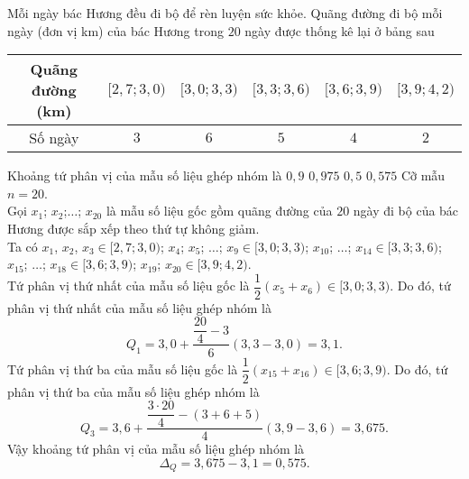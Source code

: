 \begin{ex}%
	Mỗi ngày bác Hương đều đi bộ để rèn luyện sức khỏe. Quãng đường đi bộ mỗi ngày (đơn vị km) của bác Hương trong $20$ ngày được thống kê lại ở bảng sau
	\begin{center}
		\begin{tabular}{|c|c|c|c|c|c|}
			\hline
			Quãng đường (km) & $[2{,}7;3{,}0)$ & $[3{,}0;3{,}3)$ & $[3{,}3;3{,}6)$ & $[3{,}6;3{,}9)$ & $[3{,}9;4{,}2)$ \\
			\hline
			Số ngày          & $3$             & $6$             & $5$             & $4$             & $2$             \\
			\hline
		\end{tabular}
	\end{center}
	Khoảng tứ phân vị của mẫu số liệu ghép nhóm là
	\choice
	{$0{,}9$}
	{$0{,}975$}
	{$0{,}5$}
	{\True $0{,}575$}
	\loigiai
	{
	Cỡ mẫu $n=20$.\\
	Gọi $x_1$; $x_2$;$\ldots$; $x_{20}$ là mẫu số liệu gốc gồm quãng đường của $20$ ngày đi bộ của bác Hương được sắp xếp theo thứ tự không giảm.\\
	Ta có $x_1$, $x_2$, $x_3\in [2{,}7;3{,}0)$; $x_4$; $x_5$; $\ldots$; $x_9\in [3{,}0;3{,}3)$; $x_{10}$; $\ldots$; $x_{14}\in [3{,}3;3{,}6)$; \break$x_{15}$; $\ldots$; $x_{18}\in [3{,}6;3{,}9)$; $x_{19}$; $x_{20}\in [3{,}9;4{,}2)$.\\
	Tứ phân vị thứ nhất của mẫu số liệu gốc là $\dfrac{1}{2}(x_5+x_6)\in [3{,}0;3{,}3)$. Do đó, tứ phân vị thứ nhất của mẫu số liệu ghép nhóm là
	\[Q_1=3{,}0+\dfrac{\dfrac{20}{4}-3}{6}(3{,}3-3{,}0)=3{,}1.\]
	Tứ phân vị thứ ba của mẫu số liệu gốc là $\dfrac{1}{2}(x_{15}+x_{16})\in [3{,}6;3{,}9)$. Do đó, tứ phân vị thứ ba của mẫu số liệu ghép nhóm là
	\[Q_3=3{,}6+\dfrac{\dfrac{3\cdot 20}{4}-(3+6+5)}{4}(3{,}9-3{,}6)=3{,}675.\]
	Vậy khoảng tứ phân vị của mẫu số liệu ghép nhóm là
	\[\Delta_Q=3{,}675-3{,}1=0{,}575.\]
	}
\end{ex}

